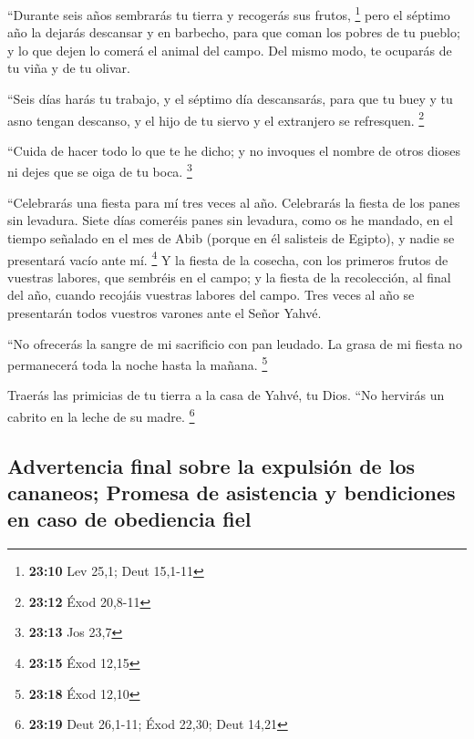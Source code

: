  ``Durante seis años sembrarás tu tierra y recogerás sus
frutos, \footnote{\textbf{23:10} Lev 25,1; Deut 15,1-11} 
pero el séptimo año la dejarás descansar y en barbecho, para que coman
los pobres de tu pueblo; y lo que dejen lo comerá el animal del campo.
Del mismo modo, te ocuparás de tu viña y de tu olivar.

 ``Seis días harás tu trabajo, y el séptimo día
descansarás, para que tu buey y tu asno tengan descanso, y el hijo de tu
siervo y el extranjero se refresquen. \footnote{\textbf{23:12} Éxod
  20,8-11}

 ``Cuida de hacer todo lo que te he dicho; y no invoques
el nombre de otros dioses ni dejes que se oiga de tu boca. \footnote{\textbf{23:13}
  Jos 23,7}

 ``Celebrarás una fiesta para mí tres veces al año.
 Celebrarás la fiesta de los panes sin levadura. Siete
días comeréis panes sin levadura, como os he mandado, en el tiempo
señalado en el mes de Abib (porque en él salisteis de Egipto), y nadie
se presentará vacío ante mí. \footnote{\textbf{23:15} Éxod 12,15}
 Y la fiesta de la cosecha, con los primeros frutos de
vuestras labores, que sembréis en el campo; y la fiesta de la
recolección, al final del año, cuando recojáis vuestras labores del
campo.  Tres veces al año se presentarán todos vuestros
varones ante el Señor Yahvé.

 ``No ofrecerás la sangre de mi sacrificio con pan
leudado. La grasa de mi fiesta no permanecerá toda la noche hasta la
mañana. \footnote{\textbf{23:18} Éxod 12,10}

 Traerás las primicias de tu tierra a la casa de Yahvé,
tu Dios. ``No hervirás un cabrito en la leche de su madre. \footnote{\textbf{23:19}
  Deut 26,1-11; Éxod 22,30; Deut 14,21}

\hypertarget{advertencia-final-sobre-la-expulsiuxf3n-de-los-cananeos-promesa-de-asistencia-y-bendiciones-en-caso-de-obediencia-fiel}{%
\subsection{Advertencia final sobre la expulsión de los cananeos;
Promesa de asistencia y bendiciones en caso de obediencia
fiel}\label{advertencia-final-sobre-la-expulsiuxf3n-de-los-cananeos-promesa-de-asistencia-y-bendiciones-en-caso-de-obediencia-fiel}}

